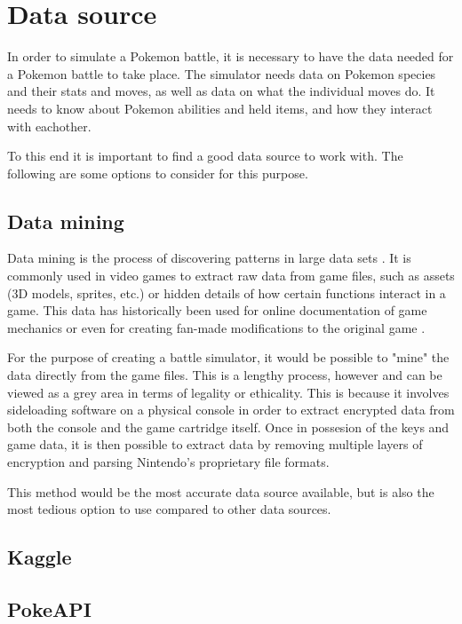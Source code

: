\section{Data source}
\label{sec:data-source}

In order to simulate a Pokemon battle, it is necessary to have the data needed for a Pokemon battle to take place.
The simulator needs data on Pokemon species and their stats and moves, as well as data on what the individual moves do.
It needs to know about Pokemon abilities and held items, and how they interact with eachother.

To this end it is important to find a good data source to work with. The following are some options to consider
for this purpose.

\subsection{Data mining}
Data mining is the process of discovering patterns in large data sets \cite{DataMining}. It is commonly used in video games to extract raw data 
from game files, such as assets (3D models, sprites, etc.) or hidden details of how certain functions interact in a game. This data has historically
been used for online documentation of game mechanics \cite{DataMiningPokemon} or even for creating fan-made modifications to the original game \cite{RenegadePlatinum}.

For the purpose of creating a battle simulator, it would be possible to "mine" the data directly from the game files. This is a lengthy process, however
and can be viewed as a grey area in terms of legality or ethicality. This is because it involves sideloading software on a physical console in order to
extract encrypted data from both the console and the game cartridge itself. Once in possesion of the keys and game data, it is then possible to extract
data by removing multiple layers of encryption and parsing Nintendo's proprietary file formats.

This method would be the most accurate data source available, but is also the most tedious option to use compared to other data sources.

\subsection{Kaggle}
\subsection{PokeAPI}
